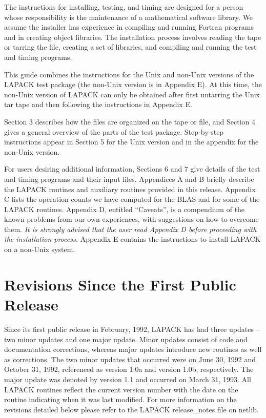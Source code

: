 The instructions for installing, testing, and timing are designed for a 
person whose
responsibility is the maintenance of a mathematical software library.
We assume the installer has experience in compiling and running 
Fortran programs and in creating object libraries.
The installation process involves reading the tape or tarring the file, creating a set of
libraries, and compiling and running the test and timing programs.

This guide combines the instructions for the Unix and non-Unix
versions of the LAPACK test package (the non-Unix version is in Appendix
E).  At this time, the non-Unix version of LAPACK can only be obtained
after first untarring the Unix tar tape and then following the instructions in
Appendix E.

Section 3 describes how the files are organized on the tape or file, and
Section 4 gives a general overview of the parts of the test package.
Step-by-step instructions appear in Section 5 for the Unix
version and in the appendix for the non-Unix version.

For users desiring additional information, Sections 6 and 7 give
details of the test and timing programs and their input files.
Appendices A and B briefly describe 
the LAPACK routines and auxiliary routines provided
in this release.  
Appendix C lists the operation counts we have computed 
for the BLAS and for some of the LAPACK routines.
Appendix D, entitled ``Caveats'', is a compendium of the known 
problems from our own experiences, with suggestions on how to 
overcome them.  {\em It is strongly advised that the user read Appendix
D before proceeding with the installation process.}
Appendix E contains the instructions to install LAPACK on a non-Unix
system.

\section{Revisions Since the First Public Release}

\dent
Since its first public release in February, 1992, LAPACK has had three
updates -- two minor updates and one major update.  Minor updates consist
of code and 
documentation corrections, whereas major updates introduce new routines
as well as corrections.  The two minor updates that occurred were on
June 30, 1992 and October 31, 1992, referenced as version 1.0a and
version 1.0b, respectively.  The major update was denoted by version
1.1 and occurred on March 31, 1993.
All LAPACK routines reflect the current version number with the date 
on the routine indicating when it was last modified.
For more information on the
revisions detailed below please refer to the LAPACK release\_notes file
on netlib.

